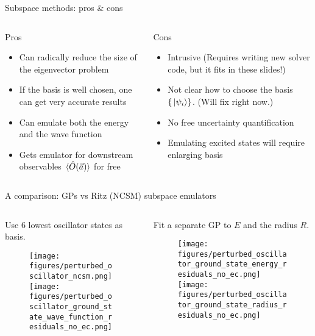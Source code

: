 \documentclass[xcolor=dvipsnames, aspectratio=169]{beamer}
\begin{document}
\begin{frame}{Subspace methods: pros \& cons}

\begin{columns}[t]
\begin{column}{0.5\textwidth}
\begin{myblock}[valign=center]{Pros}
\setlength\leftmargini{0pt}
\begin{itemize}
\item Can radically reduce the size of the eigenvector problem
\item If the basis is well chosen, one can get very accurate results
\item Can emulate both the energy and the wave function
\item Gets emulator for downstream observables $\ev*{\hat O(\lecs)}$ for free
\end{itemize}
\end{myblock}
\end{column}
\begin{column}{0.5\textwidth}
\begin{myblock}[valign=center]{Cons}
\setlength\leftmargini{0pt}
\begin{itemize}
\item Intrusive (Requires writing \alert{new} solver code, but it fits in these slides!)
\item Not clear how to choose the basis $\{\ket*{\psi_i}\}$. (\alert{Will fix right now.})
\item No free uncertainty quantification
\item Emulating excited states will require enlarging basis
\end{itemize}
\end{myblock}
\end{column}
\end{columns}
\end{frame}


\begin{frame}{A comparison: GPs vs Ritz (NCSM) subspace emulators}
\begin{columns}[t]
\begin{column}{0.5\textwidth}
Use 6 lowest oscillator states as basis.
\begin{figure}
\texttt{[image: figures/perturbed\_oscillator\_ncsm.png]}
\texttt{[image: figures/perturbed\_oscillator\_ground\_state\_wave\_function\_residuals\_no\_ec.png]}
\end{figure}
\end{column}
\begin{column}{0.5\textwidth}
Fit a separate GP to $E$ and the radius $R$.
\begin{figure}
\texttt{[image: figures/perturbed\_oscillator\_ground\_state\_energy\_residuals\_no\_ec.png]}
\texttt{[image: figures/perturbed\_oscillator\_ground\_state\_radius\_residuals\_no\_ec.png]}
\end{figure}
\end{column}
\end{columns}
\end{frame}
\end{document}
